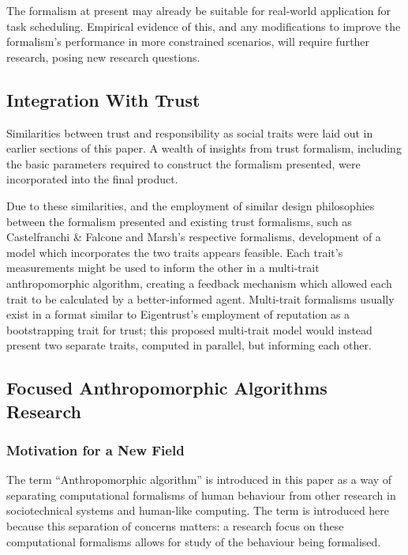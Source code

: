 The formalism at present may already be suitable for real-world application for task scheduling. Empirical evidence of this, and any modifications to improve the formalism's performance in more constrained scenarios, will require further research, posing new research questions.\par

\subsection{Integration With Trust}\label{subsec:multi-trait}
Similarities between trust and responsibility as social traits were laid out in earlier sections of this paper. A wealth of insights from trust formalism, including the basic parameters required to construct the formalism presented, were incorporated into the final product.\par

Due to these similarities, and the employment of similar design philosophies between the formalism presented and existing trust formalisms, such as Castelfranchi \& Falcone and Marsh's respective formalisms, development of a model which incorporates the two traits appears feasible. Each trait's measurements might be used to inform the other in a multi-trait anthropomorphic algorithm, creating a feedback mechanism which allowed each trait to be calculated by a better-informed agent. Multi-trait formalisms usually exist in a format similar to Eigentrust's employment of reputation as a bootstrapping trait for trust; this proposed multi-trait model would instead present two separate traits, computed in parallel, but informing each other.\par

\subsection{Focused Anthropomorphic Algorithms Research}
\subsubsection{Motivation for a New Field}
The term ``Anthropomorphic algorithm'' is introduced in this paper as a way of separating computational formalisms of human behaviour from other research in sociotechnical systems and human-like computing. The term is introduced here because this separation of concerns matters: a research focus on these computational formalisms allows for study of the behaviour being formalised.\par

